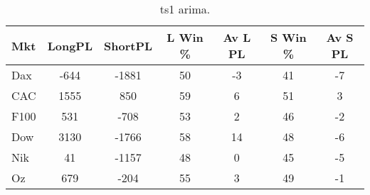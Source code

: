 \begin{table}[ht]
\centering
\caption[arima.]{ts1 arima.} 
\label{tab:chp_ts:arima1}
\begin{tabular}{lcccccc}
  \toprule Mkt & LongPL & ShortPL & L Win \% & Av L PL & S Win \% & Av S PL \\ 
  \midrule Dax & -644 & -1881 & 50 & -3 & 41 & -7 \\ 
  CAC & 1555 & 850 & 59 & 6 & 51 & 3 \\ 
  F100 & 531 & -708 & 53 & 2 & 46 & -2 \\ 
  Dow & 3130 & -1766 & 58 & 14 & 48 & -6 \\ 
  Nik & 41 & -1157 & 48 & 0 & 45 & -5 \\ 
  Oz & 679 & -204 & 55 & 3 & 49 & -1 \\ 
   \bottomrule \end{tabular}
\end{table}
